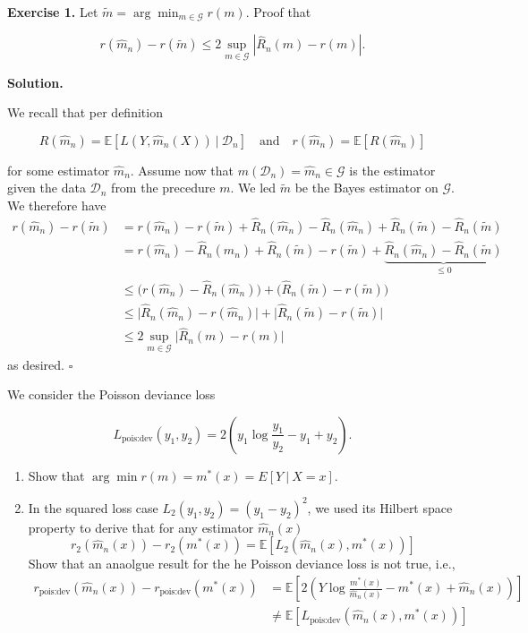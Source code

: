 \documentclass[
]{book}
\providecommand{\tightlist}{%
  \setlength{\itemsep}{0pt}\setlength{\parskip}{0pt}}
\begin{document}
\textbf{Exercise 1.} Let \(\tilde m = \arg\min_{m\in\mathcal G} r(m)\). Proof that

\[
r(\hat m_n)-r(\tilde m)\le 2\sup_{m\in\mathcal G}\left\vert\hat R_n(m)-r(m) \right\vert.
\]

\textbf{Solution.}

We recall that per definition

\[
R(\hat m_n)=\mathbb E[L(Y,\hat m_n(X))\ \vert\ \mathcal D_n]\quad \text{and}\quad r(\hat m_n)=\mathbb E[R(\hat m_n)]
\]

for some estimator \(\hat m_n\). Assume now that \(m(\mathcal D_n)=\hat m_n\in \mathcal G\) is the estimator given the data \(\mathcal D_n\) from the precedure \(m\). We led \(\tilde m\) be the Bayes estimator on \(\mathcal G\). We therefore have
\begin{align*}
r(\hat m_n)-r(\tilde m)&=r(\hat m_n)-r(\tilde m)+\hat R_n(\hat m_n)-\hat R_n(\hat m_n)+\hat R_n(\tilde m)-\hat R_n(\tilde m)\\
&=r(\hat m_n)-\hat R_n(\hat m_n)+\hat R_n(\tilde m)-r(\tilde m)+\underbrace{\hat R_n(\hat m_n)-\hat R_n(\tilde m)}_{\le 0}\\
&\le \Big(r(\hat m_n)-\hat R_n(\hat m_n)\Big)+\Big(\hat R_n(\tilde m)-r(\tilde m)\Big)\\
&\le \Big\vert \hat R_n(\hat m_n)-r(\hat m_n)\Big\vert+\Big\vert \hat R_n(\tilde m)-r(\tilde m)\Big\vert\\
&\le2\sup_{m\in \mathcal G} \Big\vert \hat R_n(m)-r(m)\Big\vert
\end{align*}
as desired. \(\square\)

We consider the Poisson deviance loss

\[
L_{\text{pois:dev}}(y_1,y_2)=2\left(y_1\log \frac{y_1}{y_2}-y_1+y_2\right).
\]

\begin{enumerate}
\def\labelenumi{\arabic{enumi}.}
\tightlist
\item
  Show that \(\arg\min r(m)=m^*(x)=E[Y\ \vert\ X=x]\).
\item
  In the squared loss case \(L_2(y_1,y_2)=(y_1-y_2)^2\), we used its Hilbert space property to derive that for any estimator \(\hat m_n(x)\)
  \[
    r_2(\hat m_n(x))-r_2(m^*(x))=\mathbb E[L_2(\hat m_n(x),m^*(x))]
    \]
  Show that an anaolgue result for the he Poisson deviance loss is not true, i.e.,
  \begin{align*}
    r_{\text{pois:dev}}(\hat m_n(x))-r_{\text{pois:dev}}(m^*(x))&=\mathbb E\left[2\left(Y\log \frac{m^*(x)}{\hat m_n(x)}-m^*(x)+\hat m_n(x)\right)\right]\\
    &\ne \mathbb E[L_{\text{pois:dev}}(\hat m_n(x),m^*(x))]
    \end{align*}
\end{enumerate}
\end{document}
